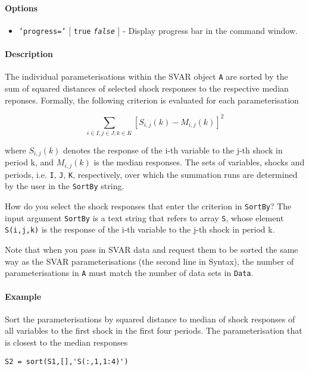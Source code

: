 \paragraph{Options}

\begin{itemize}
\itemsep1pt\parskip0pt
\item
  \texttt{'progress='} {[} \texttt{true} \textbar{}
  \emph{\texttt{false}} {]} - Display progress bar in the command
  window.
\end{itemize}

\paragraph{Description}

The individual parameterisations within the SVAR object \texttt{A} are
sorted by the sum of squared distances of selected shock responses to
the respective median reponses. Formally, the following criterion is
evaluated for each parameterisation

\[ \sum_{i\in I,j\in J,k\in K} \left[ S_{i,j}(k) - M_{i,j}(k) \right]^2 \]

where $S_{i,j}(k)$ denotes the response of the i-th variable to the j-th
shock in period k, and $M_{i,j}(k)$ is the median responses. The sets of
variables, shocks and periods, i.e. \texttt{I}, \texttt{J}, \texttt{K},
respectively, over which the summation runs are determined by the user
in the \texttt{SortBy} string.

How do you select the shock responses that enter the criterion in
\texttt{SortBy}? The input argument \texttt{SortBy} is a text string
that refers to array \texttt{S}, whose element \texttt{S(i,j,k)} is the
response of the i-th variable to the j-th shock in period k.

Note that when you pass in SVAR data and request them to be sorted the
same way as the SVAR parameterisations (the second line in Syntax), the
number of parameterisations in \texttt{A} must match the number of data
sets in \texttt{Data}.

\paragraph{Example}

Sort the parameterisations by squared distance to median of shock
responses of all variables to the first shock in the first four periods.
The parameterisation that is closest to the median responses

\begin{verbatim}
S2 = sort(S1,[],'S(:,1,1:4)')
\end{verbatim}


